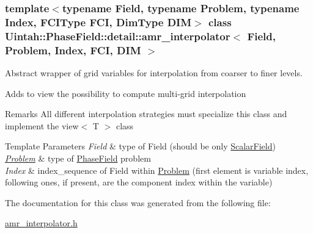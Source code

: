 \subsubsection*{template$<$typename Field, typename Problem, typename Index, F\+C\+I\+Type F\+CI, Dim\+Type D\+IM$>$\newline
class Uintah\+::\+Phase\+Field\+::detail\+::amr\+\_\+interpolator$<$ Field, Problem, Index, F\+C\+I, D\+I\+M $>$}

Abstract wrapper of grid variables for interpolation from coarser to finer levels. 

Adds to view the possibility to compute multi-\/grid interpolation

\begin{DoxyRemark}{Remarks}
All different interpolation strategies must specialize this class and implement the view$<$ T $>$ class
\end{DoxyRemark}

\begin{DoxyTemplParams}{Template Parameters}
{\em Field} & type of Field (should be only \hyperlink{structUintah_1_1PhaseField_1_1ScalarField}{Scalar\+Field}) \\
\hline
{\em \hyperlink{classUintah_1_1PhaseField_1_1Problem}{Problem}} & type of \hyperlink{namespaceUintah_1_1PhaseField}{Phase\+Field} problem \\
\hline
{\em Index} & index\+\_\+sequence of Field within \hyperlink{classUintah_1_1PhaseField_1_1Problem}{Problem} (first element is variable index, following ones, if present, are the component index within the variable) \\
\hline
\end{DoxyTemplParams}


The documentation for this class was generated from the following file\+:\begin{DoxyCompactItemize}
\item 
\hyperlink{amr__interpolator_8h}{amr\+\_\+interpolator.\+h}\end{DoxyCompactItemize}
